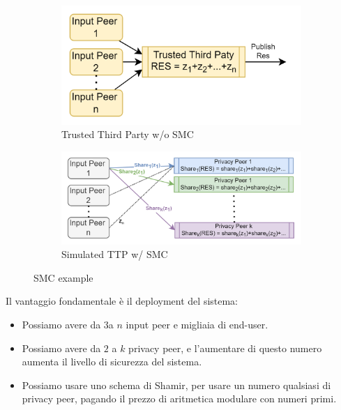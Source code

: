 \begin{figure}[h]
    \centering
    \begin{subfigure}[b]{0.4\textwidth}
    \includegraphics[width=\textwidth]{image/secret_sharing/ttp.png}
    \caption{Trusted Third Party w/o SMC}
    \label{fig:ttp}
    \end{subfigure}\quad
    \begin{subfigure}[b]{0.5\textwidth}
    \includegraphics[width=\textwidth]{image/secret_sharing/simulatedttp.png}
    \caption{Simulated TTP w/ SMC}
    \label{fig:smcttp}
    \end{subfigure}
    \caption{SMC example}
\end{figure}
Il vantaggio fondamentale è il deployment del sistema:
\begin{corollary}
\begin{itemize}
    \item Possiamo avere da $3$\footnotemark a $n$ input peer e migliaia di end-user.
    \item Possiamo avere da $2$ a $k$ privacy peer, e l'aumentare di questo numero aumenta il livello di sicurezza del sistema.
    \item Possiamo usare uno schema di Shamir, per usare un numero qualsiasi di privacy peer, pagando il prezzo di aritmetica modulare con numeri primi.
\end{itemize}
\end{corollary}
